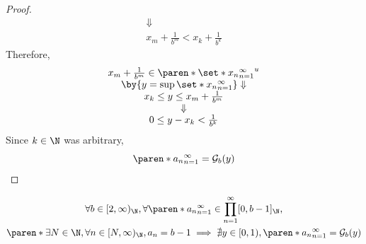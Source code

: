 \begin{proof}
\[\begin{array}{c}
      \Downarrow                                                                                                  \\
      x_{m} + \frac{1}{b^{m}} < x_{k} + \frac{1}{b^{k}}
    \end{array}
  \]
  Therefore,
  \[
    \begin{array}{c}
      x_{m} + \frac{1}{b^{m}} \in \paren*{\set*{x_{n}}_{n = 1}^{\infty}}^{u} \\
      \by{\ensuremath{y = \sup \set*{x_{n}}_{n = 1}^{\infty}}} \Downarrow    \\
      x_{k} \leq y \leq x_{m} + \frac{1}{b^{m}}                              \\
      \Downarrow                                                             \\
      0 \leq y - x_{k} < \frac{1}{b^{k}}
    \end{array}
  \]
  Since $k \in \N$ was arbitrary,
  \[
    \paren*{a_{n}}_{n = 1}^{\infty} = \mathcal{G}_{b}(y)
  \]
\end{proof}

\begin{theorem} \label{an1:thm:no-real-number-matching-greedy-base-expansion-converse}
  \[
    \begin{gathered}
      \forall b \in [2, \infty)_{\N}, \forall \paren*{a_{n}}_{n = 1}^{\infty}
      \in \prod_{n = 1}^{\infty} [0, b - 1]_{\N}, \\
      \paren*{\exists N \in \N, \forall n \in [N, \infty)_{\N}, a_{n} = b - 1}
      \implies \nexists y \in [0, 1), \paren*{a_{n}}_{n = 1}^{\infty} = \mathcal{G}_{b}(y)
    \end{gathered}
  \]
\end{theorem}

